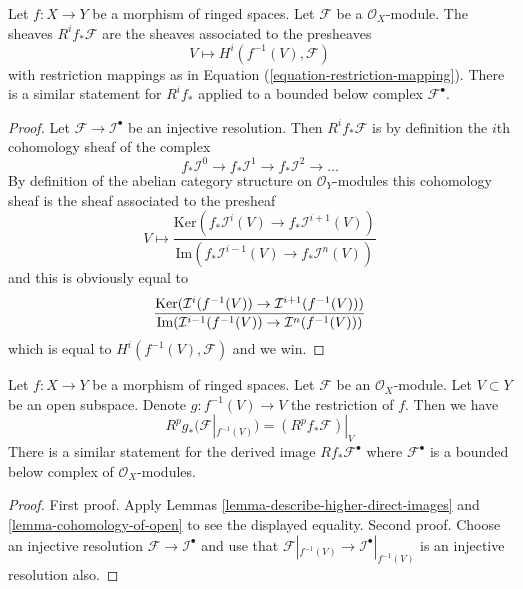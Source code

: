 \begin{lemma}
\label{lemma-describe-higher-direct-images}
Let $f : X \to Y$ be a morphism of ringed spaces.
Let $\mathcal{F}$ be a $\mathcal{O}_X$-module.
The sheaves $R^if_*\mathcal{F}$ are the sheaves
associated to the presheaves
$$
V \longmapsto H^i(f^{-1}(V), \mathcal{F})
$$
with restriction mappings as in Equation (\ref{equation-restriction-mapping}).
There is a similar statement for $R^if_*$ applied to a
bounded below complex $\mathcal{F}^\bullet$.
\end{lemma}

\begin{proof}
Let $\mathcal{F} \to \mathcal{I}^\bullet$ be an injective resolution.
Then $R^if_*\mathcal{F}$ is by definition the $i$th cohomology sheaf
of the complex
$$
f_*\mathcal{I}^0 \to f_*\mathcal{I}^1 \to f_*\mathcal{I}^2 \to \ldots
$$
By definition of the abelian category structure on $\mathcal{O}_Y$-modules
this cohomology sheaf is the sheaf associated to the presheaf
$$
V
\longmapsto
\frac{\text{Ker}(f_*\mathcal{I}^i(V) \to f_*\mathcal{I}^{i + 1}(V))}
{\text{Im}(f_*\mathcal{I}^{i - 1}(V) \to f_*\mathcal{I}^n(V))}
$$
and this is obviously equal to
$$
\frac{\text{Ker}(\mathcal{I}^i(f^{-1}(V)) \to \mathcal{I}^{i + 1}(f^{-1}(V)))}
{\text{Im}(\mathcal{I}^{i - 1}(f^{-1}(V)) \to \mathcal{I}^n(f^{-1}(V)))} \\
$$
which is equal to $H^i(f^{-1}(V), \mathcal{F})$
and we win.
\end{proof}

\begin{lemma}
\label{lemma-localize-higher-direct-images}
Let $f : X \to Y$ be a morphism of ringed spaces.
Let $\mathcal{F}$ be an $\mathcal{O}_X$-module.
Let $V \subset Y$ be an open subspace.
Denote $g : f^{-1}(V) \to V$ the restriction of $f$.
Then we have
$$
R^pg_*(\mathcal{F}|_{f^{-1}(V)}) = (R^pf_*\mathcal{F})|_V
$$
There is a similar statement for the
derived image $Rf_*\mathcal{F}^\bullet$ where $\mathcal{F}^\bullet$
is a bounded below complex of $\mathcal{O}_X$-modules.
\end{lemma}

\begin{proof}
First proof. Apply Lemmas \ref{lemma-describe-higher-direct-images}
and \ref{lemma-cohomology-of-open} to see the displayed equality.
Second proof. Choose an injective resolution
$\mathcal{F} \to \mathcal{I}^\bullet$
and use that $\mathcal{F}|_{f^{-1}(V)} \to \mathcal{I}^\bullet|_{f^{-1}(V)}$
is an injective resolution also.
\end{proof}






